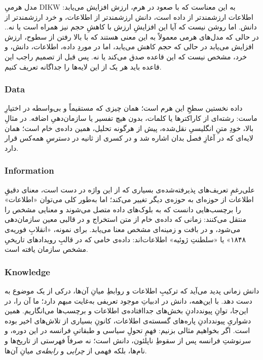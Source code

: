 مدل هرمیِ DIKW به این معناست که با صعود در هرم، ارزش افزایش می‌یابد: اطلاعات ارزشمندتر از داده است، دانش ارزشمندتر از اطلاعات، و خرد ارزشمندتر از دانش\autocite{mishra2018}. اما روشن نیست که آیا این افزایشِ ارزش با کاهشِ حجم نیز همراه است یا نه.. در حالی که مدل‌های هرمی معمولاً به این معنی هستند که با بالا رفتن از سطوح، ارزش افزایش می‌یابد در حالی که حجم کاهش می‌یابد، اما در موردِ داده، اطلاعات، دانش، و خرد، مشخص نیست که این قاعده صدق می‌کند یا نه. پس قبل از تصمیم راجب این قاعده باید هر یک از این لایه‌ها را جداگانه تعریف کنیم.
\subsubsection{Data}
داده نخستین سطحِ این هرم است؛ همان چیزی که مستقیماً و بی‌واسطه در اختیارِ ماست: رشته‌ای از کاراکترها یا کلمات، بدون هیچ تفسیر یا سازمان‌دهیِ اضافه. در مثالِ بالا، خودِ متنِ انگلیسیِ نقل‌شده، پیش از هرگونه تحلیل، همین داده‌ی خام است؛ همان لایه‌ای که در آغازِ فصل بدان اشاره شد و در کسری از ثانیه در دسترسِ همه‌کس قرار دارد.

\subsubsection{Information}
علی‌رغمِ تعریف‌های پذیرفته‌شده‌ی بسیاری که از این واژه در دست است، معنای دقیقِ اطلاعات از حوزه‌ای به حوزه‌ی دیگر تغییر می‌کند؛ اما به‌طور کلی می‌توان «اطلاعات» را برچسب‌هایی دانست که به بلوک‌های داده متصل می‌شوند و معنایی مشخص را منتقل می‌کنند: زمانی که داده‌ی خام از متن استخراج و در قالبی معین سازمان‌دهی می‌شود، و در بافت و زمینه‌ای مشخص معنا می‌یابد. برای نمونه، «انقلابِ فوریه‌ی ۱۸۴۸» یا «سلطنتِ ژوئیه» اطلاعات‌اند: داده‌ی خامی که در قالبِ رویدادهای تاریخیِ مشخص سازمان یافته است.

\subsubsection{Knowledge}
دانش زمانی پدید می‌آید که ترکیبِ اطلاعات و روابطِ میانِ آن‌ها، درکی از یک موضوع به دست دهد. با این‌همه، دانش در ادبیاتِ موجود تعریفی به‌غایت مبهم دارد؛ ما آن را، در این‌جا، توانِ پیونددادنِ بخش‌های جدا‌افتاده‌ی اطلاعات و برچسب‌ها می‌انگاریم. همین دشواریِ پیونددادنِ پاره‌های گسسته‌ی اطلاعات، کانونِ بسیاری از تلاش‌های اخیر بوده است. اگر بخواهیم مثالی بزنیم: فهمِ تحولِ سیاسی و طبقاتیِ فرانسه در این دوره، و سرنوشتِ فرانسه پس از سقوطِ ناپلئون، دانش است؛ نه صرفاً فهرستی از تاریخ‌ها و نام‌ها، بلکه فهمی از \emph{چرایی} و \emph{رابطه‌ی} میانِ آن‌ها.

